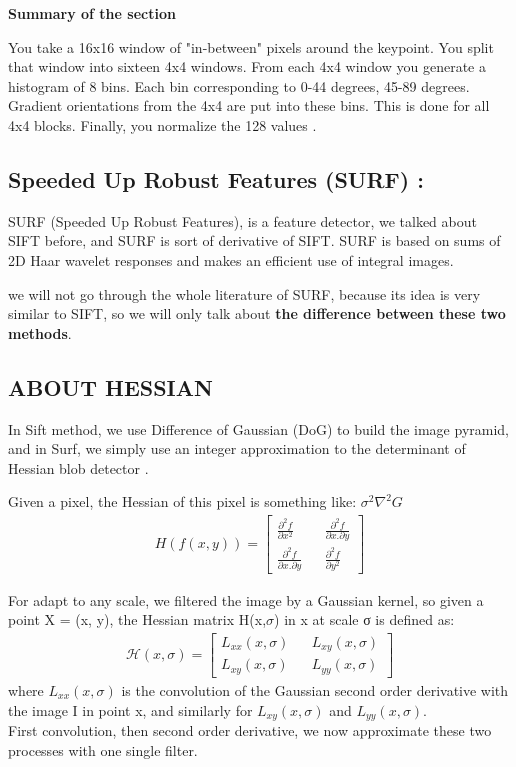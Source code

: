 \textbf{Summary of the section }

You take a 16x16 window of "in-between" pixels around the keypoint. You split that window into sixteen 4x4 windows. From each 4x4 window you generate a histogram of 8 bins. Each bin corresponding to 0-44 degrees, 45-89 degrees. Gradient orientations from the 4x4 are put into these bins. This is done for all 4x4 blocks. Finally, you normalize the 128 values .

\subsection{Speeded Up Robust Features (SURF) :}
SURF (Speeded Up Robust Features), is a feature detector, we talked about SIFT before, and SURF is sort of derivative of SIFT. SURF is based on sums of 2D Haar wavelet responses and makes an efficient use of integral images.

we will not go through  the whole literature  of SURF, because its idea is very similar to SIFT, so we will only talk about \textbf{the difference between these two methods}.

\subsection{ABOUT HESSIAN}
In Sift method, we use Difference of Gaussian (DoG) to build the image pyramid, and in Surf, we simply use an integer approximation to the determinant of Hessian blob detector .

Given a pixel, the Hessian of this pixel is something like:
$\sigma^2\nabla^2G$ \\

\begin{gather}
H(f(x,y)) =
\begin{bmatrix}
                 {\frac {\partial^2 f} {\partial x^2}} && { \frac {\partial^2 f} {\partial x.\partial y} }\\
                 {\frac  {\partial^2 f}{\partial x.\partial y}} && { \frac {\partial^2 f} {\partial y^2}}
\end{bmatrix}
\end{gather}

For adapt to any scale, we filtered the image by a Gaussian kernel, so given a point X = (x, y), the Hessian matrix H(x,$\sigma$) in x at scale σ is defined as:
\begin{gather}
 \mathcal{H}(x,\sigma) =
\begin{bmatrix}
                 {L_{xx}(x,\sigma)}  && {L_{xy}(x,\sigma)} \\
                 {L_{xy}(x,\sigma)} && {L_{yy}(x,\sigma)}
\end{bmatrix}
\end{gather}
where ${L_{xx}(x,\sigma)}$ is the convolution of the Gaussian second order derivative with the image I in point x, and similarly for ${L_{xy}(x,\sigma)}$ and ${L_{yy}(x,\sigma)}$.\\
First convolution, then second order derivative, we now approximate these two processes with one single filter.\\


